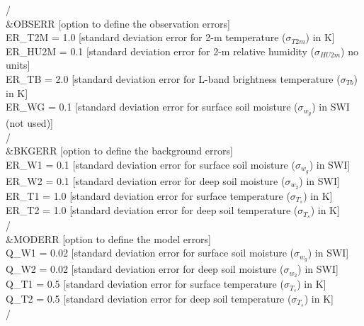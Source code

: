 \documentclass[12pt]{article}
\begin{document}
{{{{ /\\
 \&OBSERR {\rm [option to define the observation errors]}\\
   ER\_T2M = 1.0 [\rm standard deviation error for 2-m temperature ($\sigma_{T2m}$) in K]\\
   ER\_HU2M = 0.1 [\rm standard deviation error for 2-m relative humidity ($\sigma_{HU2m}$) no units]\\
   ER\_TB = 2.0 [\rm standard deviation error for L-band brightness temperature ($\sigma_{Tb}$) in K]\\
   ER\_WG = 0.1 [\rm standard deviation error for surface soil moisture ($\sigma_{w_g}$) in SWI (not used)]\\
 /\\
 \&BKGERR {\rm [option to define the background errors]}\\
   ER\_W1 = 0.1 [\rm standard deviation error for surface soil moisture ($\sigma_{w_g}$) in SWI]\\ 
   ER\_W2 = 0.1 [\rm standard deviation error for deep soil moisture ($\sigma_{w_2}$) in SWI]\\  
   ER\_T1 = 1.0 [\rm standard deviation error for surface temperature ($\sigma_{T_s}$) in K]\\ 
   ER\_T2 = 1.0 [\rm standard deviation error for deep soil temperature ($\sigma_{T_s}$) in K]\\ 
 /\\
 \&MODERR {\rm [option to define the model errors]}\\
   Q\_W1 = 0.02 [\rm standard deviation error for surface soil moisture ($\sigma_{w_g}$) in SWI]\\
   Q\_W2 = 0.02 [\rm standard deviation error for deep soil moisture ($\sigma_{w_2}$) in SWI]\\
   Q\_T1 = 0.5 [\rm standard deviation error for surface temperature ($\sigma_{T_s}$) in K]\\
   Q\_T2 = 0.5 [\rm standard deviation error for deep soil temperature ($\sigma_{T_s}$) in K]\\
 /}
}}}
\end{document}
